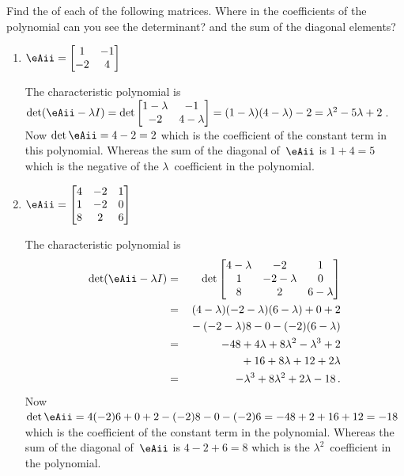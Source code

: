 \begin{example} \label{eg:}
Find the  of each of the following matrices.  
Where in the coefficients of the polynomial can you see the determinant? and the sum of the diagonal elements?
\begin{enumerate}
\item \(\eAii=\begin{bmatrix} 1&-1\\-2&4 \end{bmatrix}\)
\begin{solution} 
The characteristic polynomial is \(\det(\eAii-\lambda I)
=\det\begin{bmatrix} 1-\lambda&-1\\-2&4-\lambda \end{bmatrix}
=(1-\lambda)(4-\lambda)-2
=\lambda^2-5\lambda+2\)\,.
Now \(\det \eAii=4-2=2\) which is the coefficient of the constant term in this polynomial.
Whereas the sum of the diagonal of~\(\eAii\) is \(1+4=5\) which is the negative of the \(\lambda\)~coefficient in the polynomial.
\end{solution}

\item \(\eAii=\begin{bmatrix}4&-2&1
\\1&-2&0
\\8&2&6 \end{bmatrix}\)
\begin{solution} 
The characteristic polynomial is 
\begin{eqnarray*}
\det(\eAii-\lambda I)
&=&\det\begin{bmatrix} 4-\lambda&-2&1
\\1&-2-\lambda&0
\\8&2&6-\lambda \end{bmatrix}
\\&=&(4-\lambda)(-2-\lambda)(6-\lambda)+0+2
\\&&{}
-(-2-\lambda)8-0-(-2)(6-\lambda)
\\&=&-48+4\lambda+8\lambda^2-\lambda^3+2
\\&&{}
+16+8\lambda+12+2\lambda
\\&=&-\lambda^3+8\lambda^2+2\lambda-18\,.
\end{eqnarray*}
Now \(\det \eAii=4(-2)6+0+2-(-2)8-0-(-2)6=-48+2+16+12=-18\) which is the coefficient of the constant term in the polynomial.
Whereas the sum of the diagonal of~\(\eAii\) is \(4-2+6=8\) which is the \(\lambda^2\)~coefficient in the polynomial.
\end{solution}

\end{enumerate}
\end{example}

